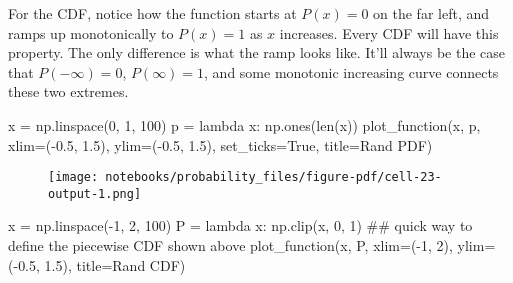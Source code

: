 \documentclass[
  letterpaper,
  DIV=11,
  numbers=noendperiod]{scrreprt}
\newenvironment{Shaded}{\begin{snugshade}}{\end{snugshade}}
\newcommand{\BuiltInTok}[1]{\textcolor[rgb]{0.00,0.23,0.31}{#1}}
\newcommand{\CommentTok}[1]{\textcolor[rgb]{0.37,0.37,0.37}{#1}}
\newcommand{\DecValTok}[1]{\textcolor[rgb]{0.68,0.00,0.00}{#1}}
\newcommand{\FloatTok}[1]{\textcolor[rgb]{0.68,0.00,0.00}{#1}}
\newcommand{\KeywordTok}[1]{\textcolor[rgb]{0.00,0.23,0.31}{#1}}
\newcommand{\NormalTok}[1]{\textcolor[rgb]{0.00,0.23,0.31}{#1}}
\newcommand{\OperatorTok}[1]{\textcolor[rgb]{0.37,0.37,0.37}{#1}}
\newcommand{\StringTok}[1]{\textcolor[rgb]{0.13,0.47,0.30}{#1}}
\newcommand{\VariableTok}[1]{\textcolor[rgb]{0.07,0.07,0.07}{#1}}
\begin{document}
For the CDF, notice how the function starts at \(P(x)=0\) on the far
left, and ramps up monotonically to \(P(x)=1\) as \(x\) increases. Every
CDF will have this property. The only difference is what the ramp looks
like. It'll always be the case that \(P(-\infty)=0\), \(P(\infty)=1\),
and some monotonic increasing curve connects these two extremes.

\begin{Shaded}
\begin{Highlighting}[]
\NormalTok{x }\OperatorTok{=}\NormalTok{ np.linspace(}\DecValTok{0}\NormalTok{, }\DecValTok{1}\NormalTok{, }\DecValTok{100}\NormalTok{)}
\NormalTok{p }\OperatorTok{=} \KeywordTok{lambda}\NormalTok{ x: np.ones(}\BuiltInTok{len}\NormalTok{(x))}
\NormalTok{plot\_function(x, p, xlim}\OperatorTok{=}\NormalTok{(}\OperatorTok{{-}}\FloatTok{0.5}\NormalTok{, }\FloatTok{1.5}\NormalTok{), ylim}\OperatorTok{=}\NormalTok{(}\OperatorTok{{-}}\FloatTok{0.5}\NormalTok{, }\FloatTok{1.5}\NormalTok{), set\_ticks}\OperatorTok{=}\VariableTok{True}\NormalTok{, title}\OperatorTok{=}\StringTok{\textquotesingle{}Rand PDF\textquotesingle{}}\NormalTok{)}
\end{Highlighting}
\end{Shaded}

\begin{figure}[H]

{\centering \texttt{[image: notebooks/probability\_files/figure-pdf/cell-23-output-1.png]}

}

\end{figure}

\begin{Shaded}
\begin{Highlighting}[]
\NormalTok{x }\OperatorTok{=}\NormalTok{ np.linspace(}\OperatorTok{{-}}\DecValTok{1}\NormalTok{, }\DecValTok{2}\NormalTok{, }\DecValTok{100}\NormalTok{)}
\NormalTok{P }\OperatorTok{=} \KeywordTok{lambda}\NormalTok{ x: np.clip(x, }\DecValTok{0}\NormalTok{, }\DecValTok{1}\NormalTok{) }\CommentTok{\#\# quick way to define the piecewise CDF shown above}
\NormalTok{plot\_function(x, P, xlim}\OperatorTok{=}\NormalTok{(}\OperatorTok{{-}}\DecValTok{1}\NormalTok{, }\DecValTok{2}\NormalTok{), ylim}\OperatorTok{=}\NormalTok{(}\OperatorTok{{-}}\FloatTok{0.5}\NormalTok{, }\FloatTok{1.5}\NormalTok{), title}\OperatorTok{=}\StringTok{\textquotesingle{}Rand CDF\textquotesingle{}}\NormalTok{)}
\end{Highlighting}
\end{Shaded}
\end{document}
